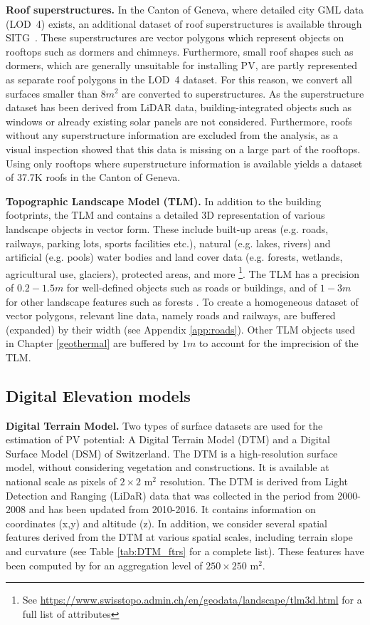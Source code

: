 \textbf{Roof superstructures.}
In the Canton of Geneva, where detailed city GML data (LOD~4) exists, an additional dataset of roof superstructures is available through SITG~\cite{sitg_superstructures_2019}. %
These superstructures are vector polygons which represent objects on rooftops such as dormers and chimneys. 
Furthermore, small roof shapes such as dormers, which are generally unsuitable for installing PV, are partly represented as separate roof polygons in the LOD~4 dataset.
For this reason, we convert all surfaces smaller than $8m^2$ are converted to superstructures. 
As the superstructure dataset has been derived from LiDAR data, building-integrated objects such as windows or already existing solar panels are not considered. 
Furthermore, roofs without any superstructure information are excluded from the analysis, as a visual inspection showed that this data is missing on a large part of the rooftops. Using only rooftops where superstructure information is available yields a dataset of 37.7K roofs in the Canton of Geneva. 

\textbf{Topographic Landscape Model (TLM).}
In addition to the building footprints, the TLM \cite{swisstopo_swisstlm3d_2018} and contains a detailed 3D representation of various landscape objects in vector form. 
These include built-up areas (e.g. roads, railways, parking lots, sports facilities etc.), natural (e.g. lakes, rivers) and artificial (e.g. pools) water bodies and land cover data (e.g. forests, wetlands, agricultural use, glaciers), protected areas, and more
\footnote{See \url{https://www.swisstopo.admin.ch/en/geodata/landscape/tlm3d.html} for a full list of attributes}.
The TLM has a precision of $0.2-1.5m$ for well-defined objects such as roads or buildings, and of $1 - 3m$ for other landscape features such as forests \cite{swisstopo_swisstlm3d_2018}. 
To create a homogeneous dataset of vector polygons, relevant line data, namely roads and railways, are buffered (expanded) by their width (see Appendix \ref{app:roads}).
Other TLM objects used in Chapter \ref{geothermal} are buffered by $1m$ to account for the imprecision of the TLM.

\subsection{Digital Elevation models}
\label{data_DEM}
\textbf{Digital Terrain Model.} Two types of surface datasets are used for the estimation of PV potential: A Digital Terrain Model (DTM) and a Digital Surface Model (DSM) of Switzerland. The DTM is a high-resolution surface model, without considering vegetation and constructions. It is available at national scale as pixels of $2\times2$ m$^2$ resolution. The DTM is derived from Light Detection and Ranging (LiDaR) data that was collected in the period from 2000-2008 and has been updated from 2010-2016.
%
It contains information on coordinates (x,y) and altitude (z). In addition, we consider several spatial features derived from the DTM at various spatial scales, including terrain slope and curvature (see Table \ref{tab:DTM_ftrs} for a complete list). These features have been computed by \citet{robert_spatial_2012} for an aggregation level of $250 \times 250$ m$^2$.

